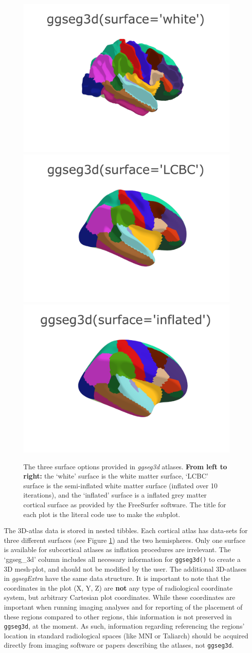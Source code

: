 \documentclass[fleqn,10pt]{wlpeerj} %
\begin{document}
\begin{figure}[H]
\includegraphics[width=0.3\linewidth]{msc_ggseg_files/figure-latex/figure7l} \includegraphics[width=0.3\linewidth]{msc_ggseg_files/figure-latex/figure7m} \includegraphics[width=0.3\linewidth]{msc_ggseg_files/figure-latex/figure7r} \caption{The three surface options provided in \emph{ggseg3d} atlases. \textbf{From left to right:} the `white' surface is the white matter surface, `LCBC' surface is the semi-inflated white matter surface (inflated over 10 iterations), and the `inflated' surface is a inflated grey matter cortical surface as provided by the FreeSurfer software. The title for each plot is the literal code use to make the subplot.}\label{fig:figure7}
\end{figure}

The 3D-atlas data is stored in nested tibbles.
Each cortical atlas has data-sets for three different surfaces (see Figure \ref{fig:figure7}) and the two hemispheres.
Only one surface is available for subcortical atlases as inflation procedures are irrelevant.
The `ggseg\_3d' column includes all necessary information for \texttt{ggseg3d()} to create a 3D mesh-plot, and should not be modified by the user.
The additional 3D-atlases in \emph{ggsegExtra} have the same data structure.
It is important to note that the coordinates in the plot (X, Y, Z) are \textbf{not} any type of radiological coordinate system, but arbitrary Cartesian plot coordinates.
While these coordinates are important when running imaging analyses and for reporting of the placement of these regions compared to other regions, this information is not preserved in \texttt{ggseg3d}, at the moment.
As such, information regarding referencing the regions' location in standard radiological spaces (like MNI or Taliarch) should be acquired directly from imaging software or papers describing the atlases, not \texttt{ggseg3d}.
\end{document}
